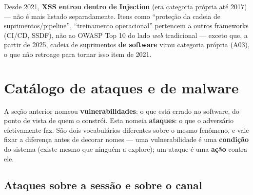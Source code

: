 \begin{cuidado}
Desde 2021, \textbf{XSS entrou dentro de Injection} (era categoria própria
até 2017) --- não é mais listado separadamente. Itens como “proteção da
cadeia de suprimentos/pipeline”, “treinamento operacional” pertencem a
outros frameworks (CI/CD, SSDF), não ao OWASP Top 10 do lado
\textit{web} tradicional --- exceto que, a partir de 2025, cadeia de
suprimentos \textbf{de software} virou categoria própria (A03), o que não
retroage para tornar isso item de 2021.
\end{cuidado}

\section{Catálogo de ataques e de malware}

A seção anterior nomeou \textbf{vulnerabilidades}: o que está errado no
software, do ponto de vista de quem o constrói. Esta nomeia \textbf{ataques}:
o que o adversário efetivamente faz. São dois vocabulários diferentes sobre o
mesmo fenômeno, e vale fixar a diferença antes de decorar nomes --- uma
vulnerabilidade é uma \textbf{condição} do sistema (existe mesmo que ninguém
a explore); um ataque é uma \textbf{ação} contra ele.

\subsection{Ataques sobre a sessão e sobre o canal}

